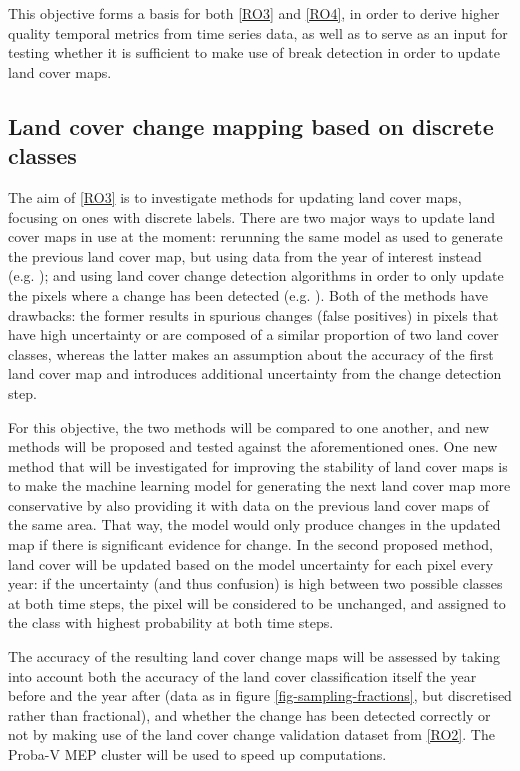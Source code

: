 \documentclass[10pt]{article}
\begin{document}
\begin{mdframed}[style=table,frametitle=\textbf{7. DETAILED DESCRIPTION OF THE RESEARCH PLAN} (max. 2500 words + 1 page literature list)]
This objective forms a basis for both \ref{RO3} and \ref{RO4}, in order to derive higher quality temporal metrics from time series data, as well as to serve as an input for testing whether it is sufficient to make use of break detection in order to update land cover maps.

\subsection{Land cover change mapping based on discrete classes}
The aim of \ref{RO3} is to investigate methods for updating land cover maps, focusing on ones with discrete labels. There are two major ways to update land cover maps in use at the moment: rerunning the same model as used to generate the previous land cover map, but using data from the year of interest instead (e.g. \citet{friedl_modis_2010}); and using land cover change detection algorithms in order to only update the pixels where a change has been detected (e.g. \citet{jin_land_2017}). Both of the methods have drawbacks: the former results in spurious changes (false positives) in pixels that have high uncertainty or are composed of a similar proportion of two land cover classes, whereas the latter makes an assumption about the accuracy of the first land cover map and introduces additional uncertainty from the change detection step.

For this objective, the two methods will be compared to one another, and new methods will be proposed and tested against the aforementioned ones. One new method that will be investigated for improving the stability of land cover maps is to make the machine learning model for generating the next land cover map more conservative by also providing it with data on the previous land cover maps of the same area. That way, the model would only produce changes in the updated map if there is significant evidence for change. In the second proposed method, land cover will be updated based on the model uncertainty for each pixel every year: if the uncertainty (and thus confusion) is high between two possible classes at both time steps, the pixel will be considered to be unchanged, and assigned to the class with highest probability at both time steps.

The accuracy of the resulting land cover change maps will be assessed by taking into account both the accuracy of the land cover classification itself the year before and the year after (data as in figure \ref{fig-sampling-fractions}, but discretised rather than fractional), and whether the change has been detected correctly or not by making use of the land cover change validation dataset from \ref{RO2}. The Proba-V MEP cluster will be used to speed up computations.


\end{mdframed}
\end{document}
